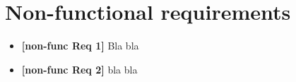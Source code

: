 \section{Non-functional requirements}
\begin{itemize}
	\item \textbf{[non-func Req 1]} Bla bla
	\item \textbf{[non-func Req 2]} bla bla
\end{itemize}